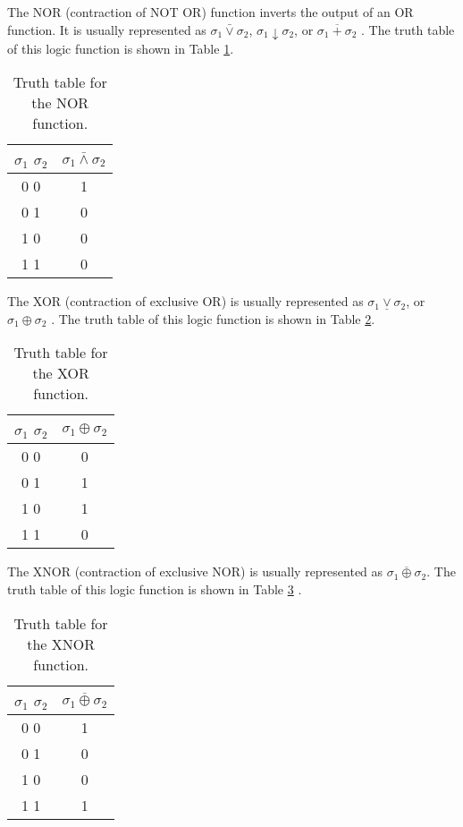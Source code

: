 The NOR (contraction of NOT OR) function inverts the output of an OR function. It is usually represented as $\sigma_{1} \bar{\vee} \sigma_{2}$, $\sigma_{1} \downarrow \sigma_{2}$, or $\overline{\sigma_{1} + \sigma_{2}} $ \cite{gates}. The truth table of this logic function is shown in Table \ref{tab:nor_table}.

\begin{table}[h]
\centering
\begin{tabular}{ |c||c| } 
 \hline
 $\sigma_{1}$	$\sigma_{2}$ & $\sigma_{1} \bar{\wedge} \sigma_{2}$ \\ 
 \hline
 \hline
 0	0 & 1\\ 
 \hline
 0	1 & 0\\
 \hline
 1	0 & 0\\
 \hline
 1	1 & 0\\
 \hline
\end{tabular}
 \caption{Truth table for the NOR function.}
 \label{tab:nor_table}
\end{table}

The XOR (contraction of exclusive OR) is usually represented as $\sigma_{1} \underline{\vee} \sigma_{2}$, or $\sigma_{1} \oplus \sigma_{2} $ \cite{gates}. The truth table of this logic function is shown in Table \ref{tab:xor_table}.

\begin{table}[h]
\centering
\begin{tabular}{ |c||c| } 
 \hline
 $\sigma_{1}$	$\sigma_{2}$ & $\sigma_{1} \oplus \sigma_{2} $ \\ 
 \hline
 \hline
 0	0 & 0\\ 
 \hline
 0	1 & 1\\
 \hline
 1	0 & 1\\
 \hline
 1	1 & 0\\
 \hline
\end{tabular}
 \caption{Truth table for the XOR function.}
 \label{tab:xor_table}
\end{table}

The XNOR (contraction of exclusive NOR) is usually represented as $\overline{\sigma_{1} \oplus \sigma_{2}} $. The truth table of this logic function is shown in Table \ref{tab:xnor_table} \cite{k_2_functions}.

\begin{table}[h]
\centering
\begin{tabular}{ |c||c| } 
 \hline
 $\sigma_{1}$	$\sigma_{2}$ & $\overline{\sigma_{1} \oplus \sigma_{2}} $ \\ 
 \hline
 \hline
 0	0 & 1\\ 
 \hline
 0	1 & 0\\
 \hline
 1	0 & 0\\
 \hline
 1	1 & 1\\
 \hline
\end{tabular}
 \caption{Truth table for the XNOR function.}
 \label{tab:xnor_table}
\end{table}


